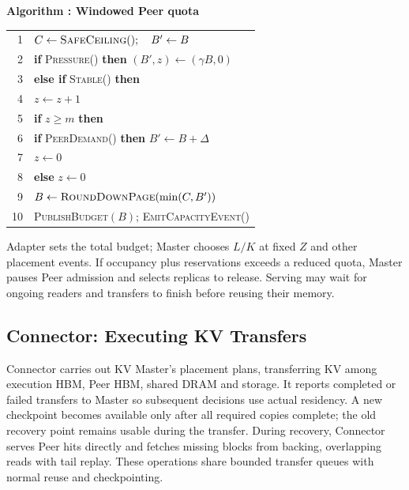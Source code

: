 \par\medskip\noindent\begin{minipage}{\columnwidth}
\raggedright
 \label{alg:adapter}
 \textbf{Algorithm \thedesignalgorithm: Windowed Peer quota}
 \par\smallskip
 \begin{tabularx}{\columnwidth}{@{}r@{\quad}X@{}}
 \toprule
 1 & $C\gets\textsc{SafeCeiling}();\quad B'\gets B$ \\
 2 & \textbf{if} \textsc{Pressure}() \textbf{then} $(B',z)\gets(\gamma B,0)$ \\
 3 & \textbf{else if} \textsc{Stable}() \textbf{then} \\
 4 & \quad $z\gets z+1$ \\
 5 & \quad \textbf{if} $z\ge m$ \textbf{then} \\
 6 & \qquad \textbf{if} \textsc{PeerDemand}() \textbf{then} $B'\gets B+\Delta$ \\
 7 & \qquad $z\gets0$ \\
 8 & \textbf{else} $z\gets0$ \\
 9 & $B\gets\textsc{RoundDownPage}(\min(C,B'))$ \\
 10 & \textsc{PublishBudget}$(B)$; \textsc{EmitCapacityEvent}() \\
 \bottomrule
 \end{tabularx}
\end{minipage}\par\medskip

Adapter sets the total budget; Master chooses $L/K$ at fixed $Z$ and
other placement events. If occupancy plus reservations exceeds a reduced
quota, Master pauses Peer admission and selects replicas to release.
Serving may wait for ongoing readers and transfers to finish before
reusing their memory.

\subsection{Connector: Executing KV Transfers}
\label{sec:connector}

Connector carries out KV Master's placement plans, transferring KV among
execution HBM, Peer HBM, shared DRAM and storage. It reports completed or
failed transfers to Master so subsequent decisions use actual residency.
A new checkpoint becomes available only after all required copies complete;
the old recovery point remains usable during the transfer. During recovery,
Connector serves Peer hits directly and fetches missing blocks from backing,
overlapping reads with tail replay. These operations share bounded transfer
queues with normal reuse and checkpointing.
